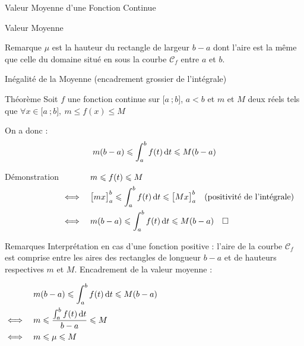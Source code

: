\documentclass{coursbook}
\begin{document}
\begin{Gpartie}{Valeur Moyenne d'une Fonction Continue}
\begin{Spartie}{Valeur Moyenne}
\begin{SSpartie}{Remarque}
                $\mu$ est la hauteur du rectangle de largeur $b-a$ dont l'aire est la même que celle du domaine situé en sous la courbe $\mathcal{C}_f$ entre $a$ et $b$.
            \end{SSpartie}
        \end{Spartie}
        \begin{Spartie}{Inégalité de la Moyenne (encadrement \og grossier \fg{} de l'intégrale)} 
            \begin{SSpartie}{Théorème} 
                Soit $f$ une fonction continue sur $\big[a~;b\big]$, $a<b$ et $m$ et $M$ deux réels tels que $\forall x\in\big[a~;b\big],~m\leq f(x)\leq M$

                On a donc : \[m(b-a)\leqslant\int_a^b f(t)\,\mathrm{d}t\leqslant M(b-a)\]
                \begin{SSSpartie}{Démonstration} 
                    $\begin{aligned}[t]
                        &\quad m\leqslant f(t)\leqslant M \\
                        \iff&\quad\big[mx\big]_a^b\leqslant\int_a^b f(t)\,\mathrm{d}t\leqslant \big[Mx\big]_a^b\quad\text{(positivité de l'intégrale)} \\
                        \iff&\quad m(b-a)\leqslant\int_a^b f(t)\,\mathrm{d}t \leqslant M(b-a)\quad\square
                    \end{aligned}$
                \end{SSSpartie}
            \end{SSpartie}
            \begin{SSpartie}{Remarques} 
                Interprétation en cas d'une fonction positive : l'aire de la courbe $\mathcal{C}_f$ est comprise entre les aires des rectangles de longueur $b-a$ et de hauteurs respectives $m$ et $M$.
                \pagebreak
                Encadrement de la valeur moyenne :

                $\begin{aligned}[t]
                    &\quad m(b-a)\leq\int_a^b f(t)\dt \leq M(b-a) \\
                    \iff&\quad m\leq\frac{\int_a^b f(t)\dt}{b-a}\leq M \\
                    \iff&\quad m\leq\mu\leq M
                \end{aligned}$
            \end{SSpartie}
        \end{Spartie}
    \end{Gpartie}
\end{document}

